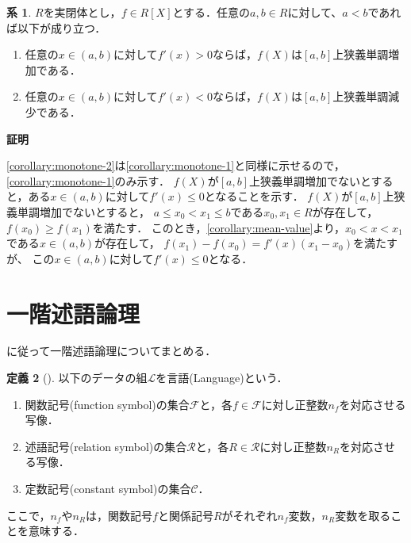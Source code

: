 \documentclass[uplatex, dvipdfmx]{jsarticle}
\makeatletter
\numberwithin{equation}{section}
\renewenvironment{proof}[1][\proofname]{\par
  \pushQED{\qed}%
  \normalfont \topsep6\p@\@plus6\p@\relax
  \trivlist
  \item\relax
  {\bfseries
  #1\@addpunct{.}}\hspace\labelsep\ignorespaces
}{
  \popQED\endtrivlist\@endpefalse
}
\theoremstyle{definition}
\newtheorem{definition}{定義}[section]
\newtheorem{corollary}[definition]{系}
\renewcommand{\proofname}{\textbf{証明}}
\makeatother
\begin{document}
\begin{corollary}\label{corollary:monotone}
     $R$を実閉体とし，$f \in R[X]$とする．任意の$a, b \in R$に対して、$a<b$であれば以下が成り立つ．
     \begin{enumerate}
          \item \label{corollary:monotone-1}
          任意の$x \in (a,b)$に対して$f'(x)>0$ならば，$f(X)$は$[a,b]$上狭義単調増加である．
          \item \label{corollary:monotone-2}
          任意の$x \in (a,b)$に対して$f'(x)<0$ならば，$f(X)$は$[a,b]$上狭義単調減少である．
     \end{enumerate}
\end{corollary}
\begin{proof}
     \ref{corollary:monotone-2}は\ref{corollary:monotone-1}と同様に示せるので，\ref{corollary:monotone-1}のみ示す．
     $f(X)$が$[a,b]$上狭義単調増加でないとすると，ある$x \in (a,b)$に対して$f'(x) \leq 0$となることを示す．
     $f(X)$が$[a,b]$上狭義単調増加でないとすると，
     $a \leq x_0 < x_1 \leq b$である$x_0, x_1 \in R$が存在して，$f(x_0) \geq f(x_1)$を満たす．
     このとき，\cref{corollary:mean-value}より，$x_0 < x < x_1$である$x \in (a,b)$が存在して，
     $f(x_1) - f(x_0) = f'(x)(x_1 - x_0)$を満たすが、
     この$x \in (a,b)$に対して$f'(x) \leq 0$となる．
\end{proof}

\section{一階述語論理}

\cite{MR1924282}に従って一階述語論理についてまとめる．

\begin{definition}[{\cite[Definition 1.1.1
     ]{MR1924282}}]
     以下のデータの組$\mathcal{L}$を言語(Language)という．
     \begin{enumerate}
          \item 関数記号(function symbol)の集合$\mathcal{F}$と，各$f \in \mathcal{F}$に対し正整数$n_f$を対応させる写像．
          \item 述語記号(relation symbol)の集合$\mathcal{R}$と，各$R \in \mathcal{R}$に対し正整数$n_R$を対応させる写像．
          \item 定数記号(constant symbol)の集合$\mathcal{C}$．
     \end{enumerate}
\end{definition}

ここで，$n_f$や$n_R$は，関数記号$f$と関係記号$R$がそれぞれ$n_f$変数，$n_R$変数を取ることを意味する．
\end{document}
